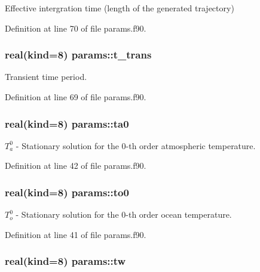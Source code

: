Effective intergration time (length of the generated trajectory) 



Definition at line 70 of file params.\-f90.

\hypertarget{classparams_aabf0943afa2272a8bbbd58c49ad0db38}{
\subsubsection[{t\-\_\-trans}]{\setlength{\rightskip}{0pt plus 5cm}real(kind=8) params\-::t\-\_\-trans}}\label{classparams_aabf0943afa2272a8bbbd58c49ad0db38}


Transient time period. 



Definition at line 69 of file params.\-f90.

\hypertarget{classparams_af3fdd8c130a667bca95de5ebf9e5f492}{
\subsubsection[{ta0}]{\setlength{\rightskip}{0pt plus 5cm}real(kind=8) params\-::ta0}}\label{classparams_af3fdd8c130a667bca95de5ebf9e5f492}


$T_a^0$ -\/ Stationary solution for the 0-\/th order atmospheric temperature. 



Definition at line 42 of file params.\-f90.

\hypertarget{classparams_ad880ab6d5fab6c7a095b526383e75404}{
\subsubsection[{to0}]{\setlength{\rightskip}{0pt plus 5cm}real(kind=8) params\-::to0}}\label{classparams_ad880ab6d5fab6c7a095b526383e75404}


$T_o^0$ -\/ Stationary solution for the 0-\/th order ocean temperature. 



Definition at line 41 of file params.\-f90.

\hypertarget{classparams_a0955c0296092bb15d2dcd120d72ad479}{
\subsubsection[{tw}]{\setlength{\rightskip}{0pt plus 5cm}real(kind=8) params\-::tw}}\label{classparams_a0955c0296092bb15d2dcd120d72ad479}


